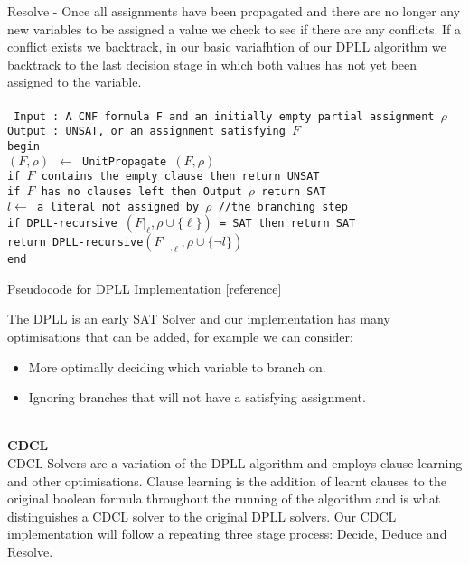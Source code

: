 \documentclass[12pt,a4paper]{article}
\begin{document}
Resolve - Once all assignments have been propagated and there are no longer any new variables to be assigned a value we check to see if there are any conflicts. If a conflict exists we backtrack, in our basic variafhtion of our DPLL algorithm we backtrack to the last decision stage in which both values has not yet been assigned to the variable.\\\\
\texttt{
Input : A CNF formula F and an initially empty partial assignment $\rho$ \\
Output : UNSAT, or an assignment satisfying $F$\\
begin\\
\hspace*{1cm}$(F,\rho)$ $\leftarrow$ UnitPropagate $(F,\rho)$\\
\hspace*{1cm}if $F$ contains the empty clause then return UNSAT\\
\hspace*{1cm}if $F$ has no clauses left then Output $\rho$ return SAT\\
\hspace*{1cm}$l \leftarrow$ a literal not assigned by $\rho$  //the branching step \\
\hspace*{1cm}if DPLL-recursive $(F |_\ell,\rho \cup \{\ell\})$ = SAT then return SAT\\
\hspace*{1cm}return DPLL-recursive$(F |_{\neg\ell},\rho \cup \{\neg l \})$ \\
end
}
\begin{center}Pseudocode for DPLL Implementation [reference] \end{center}
The DPLL is an early SAT Solver and our implementation has many optimisations that can be added, for example we can consider: 
\begin{itemize}
	\item{More optimally deciding which variable to branch on.}
	\item{Ignoring branches that will not have a satisfying assignment.}
\end{itemize}
\hfill\\
{\bf CDCL}\\
CDCL Solvers are a variation of the DPLL algorithm and employs clause learning and other optimisations. Clause learning is the addition of learnt clauses to the original boolean formula throughout the running of the algorithm and is what distinguishes a CDCL solver to the original DPLL solvers. Our CDCL implementation will follow a repeating three stage process: Decide, Deduce and Resolve. 
\end{document}

